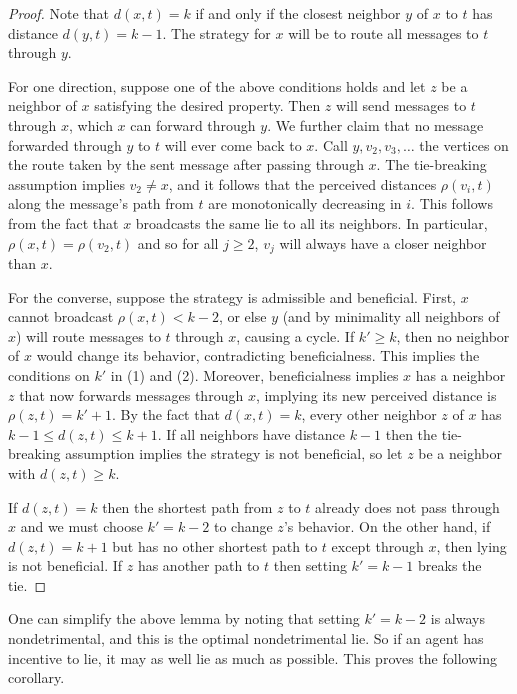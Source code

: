 \documentclass[prodmode,acmec]{ec-acmsmall}
\begin{document}
\begin{proof}

Note that $d(x,t) = k$ if and only if the closest neighbor $y$ of $x$ to $t$
has distance $d(y,t) = k-1$. The strategy for $x$ will be to route all messages
to $t$ through $y$.

For one direction, suppose one of the above conditions holds and let $z$ be a
neighbor of $x$ satisfying the desired property. Then $z$ will send messages to
$t$ through $x$, which $x$ can forward through $y$. We further claim that no
message forwarded through $y$ to $t$ will ever come back to $x$. Call $y, v_2,
v_3, \dots$ the vertices on the route taken by the sent message after passing
through $x$. The tie-breaking assumption implies $v_2 \neq x$, and it follows
that the perceived distances $\rho(v_i, t)$ along the message's path from $t$
are monotonically decreasing in $i$. This follows from the fact that $x$
broadcasts the same lie to all its neighbors. In particular, $\rho(x,t) =
\rho(v_2, t)$ and so for all $j \geq 2$, $v_j$ will always have a closer
neighbor than $x$.

For the converse, suppose the strategy is admissible and beneficial. First, $x$
cannot broadcast $\rho(x,t) < k-2$, or else $y$ (and by minimality all
neighbors of $x$) will route messages to $t$ through $x$, causing a cycle. If
$k' \geq k$, then no neighbor of $x$ would change its behavior, contradicting
beneficialness. This implies the conditions on $k'$ in (1) and (2). Moreover,
beneficialness implies $x$ has a neighbor $z$ that now forwards messages
through $x$, implying its new perceived distance is $\rho(z,t) = k' + 1$. By
the fact that $d(x,t) = k$, every other neighbor $z$ of $x$ has $k-1 \leq
d(z,t) \leq k+1$. If all neighbors have distance $k-1$ then the tie-breaking
assumption implies the strategy is not beneficial, so let $z$ be a neighbor
with $d(z,t) \geq k$.

If $d(z,t) = k$ then the shortest path from $z$ to $t$ already does not pass
through $x$ and we must choose $k' = k-2$ to change $z$'s behavior. On the
other hand, if $d(z,t) = k+1$ but has no other shortest path to $t$ except
through $x$, then lying is not beneficial. If $z$ has another
path to $t$ then setting $k' = k-1$ breaks the tie.
\end{proof}

One can simplify the above lemma by noting that setting $k' = k-2$ is always
nondetrimental, and this is the optimal nondetrimental lie. So if an agent has
incentive to lie, it may as well lie as much as possible. This proves the
following corollary.
\end{document}
